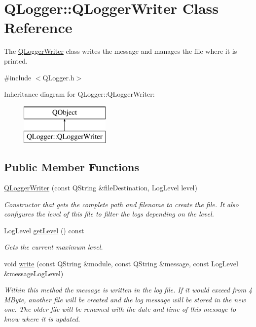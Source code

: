 \hypertarget{class_q_logger_1_1_q_logger_writer}{}\section{Q\+Logger\+::Q\+Logger\+Writer Class Reference}
\label{class_q_logger_1_1_q_logger_writer}


The \mbox{\hyperlink{class_q_logger_1_1_q_logger_writer}{Q\+Logger\+Writer}} class writes the message and manages the file where it is printed.  




{\ttfamily \#include $<$Q\+Logger.\+h$>$}

Inheritance diagram for Q\+Logger\+::Q\+Logger\+Writer\+:\begin{figure}[H]
\begin{center}
\leavevmode
\includegraphics[height=2.000000cm]{class_q_logger_1_1_q_logger_writer}
\end{center}
\end{figure}
\subsection*{Public Member Functions}
\begin{DoxyCompactItemize}
\item 
\mbox{\hyperlink{class_q_logger_1_1_q_logger_writer_ae0ae01f345bbc61fe4c497c2255cac28}{Q\+Logger\+Writer}} (const Q\+String \&file\+Destination, Log\+Level level)
\begin{DoxyCompactList}\small\item\em Constructor that gets the complete path and filename to create the file. It also configures the level of this file to filter the logs depending on the level. \end{DoxyCompactList}\item 
Log\+Level \mbox{\hyperlink{class_q_logger_1_1_q_logger_writer_ae4f61d59ae0ca39058ad70eeda3e6543}{get\+Level}} () const
\begin{DoxyCompactList}\small\item\em Gets the current maximum level. \end{DoxyCompactList}\item 
void \mbox{\hyperlink{class_q_logger_1_1_q_logger_writer_a8a278ff2d4969ce97b67306f6f40fd57}{write}} (const Q\+String \&module, const Q\+String \&message, const Log\+Level \&message\+Log\+Level)
\begin{DoxyCompactList}\small\item\em Within this method the message is written in the log file. If it would exceed from 4 M\+Byte, another file will be created and the log message will be stored in the new one. The older file will be renamed with the date and time of this message to know where it is updated. \end{DoxyCompactList}\end{DoxyCompactItemize}



